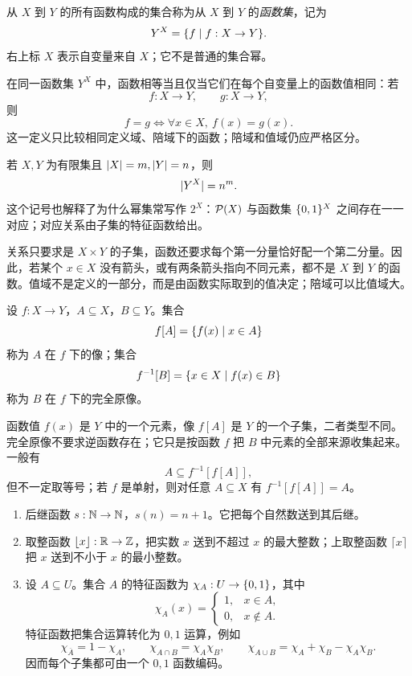 \begin{definition}[函数集]\label{function-set}
  从 $X$ 到 $Y$ 的所有函数构成的集合称为从 $X$ 到 $Y$ 的\emph{函数集}，记为
  \[
  Y^X=\{f\mid f:X\to Y\}.
  \]
  右上标 $X$ 表示自变量来自 $X$；它不是普通的集合幂。
\end{definition}

在同一函数集 $Y^X$ 中，函数相等当且仅当它们在每个自变量上的函数值相同：若
\[
f:X\to Y,\qquad g:X\to Y,
\]
则
\[
f=g\Longleftrightarrow \forall x\in X,\ f(x)=g(x).
\]
这一定义只比较相同定义域、陪域下的函数；陪域和值域仍应严格区分。

若 $X,Y$ 为有限集且 $\lvert X\rvert=m,\lvert Y\rvert=n$，则
\[
\lvert Y^X\rvert=n^m.
\]
这个记号也解释了为什么幂集常写作 $2^X$：$\mathcal P(X)$ 与函数集 $\{0,1\}^X$ 之间存在一一对应；对应关系由子集的特征函数给出。


\begin{pitfall}[函数与一般关系的区别]\label{function-relation}
  关系只要求是 $X\times Y$ 的子集，函数还要求每个第一分量恰好配一个第二分量。因此，若某个 $x\in X$ 没有箭头，或有两条箭头指向不同元素，都不是 $X$ 到 $Y$ 的函数。值域不是定义的一部分，而是由函数实际取到的值决定；陪域可以比值域大。
\end{pitfall}

\begin{definition}[像与完全原像]\label{image-preimage-function}
  设 $f:X\to Y$，$A\subseteq X$，$B\subseteq Y$。集合
  \[
  f[A]=\{f(x)\mid x\in A\}
  \]
  称为 $A$ 在 $f$ 下的像；集合
  \[
  f^{-1}[B]=\{x\in X\mid f(x)\in B\}
  \]
  称为 $B$ 在 $f$ 下的完全原像。
\end{definition}

函数值 $f(x)$ 是 $Y$ 中的一个元素，像 $f[A]$ 是 $Y$ 的一个子集，二者类型不同。完全原像不要求逆函数存在；它只是按函数 $f$ 把 $B$ 中元素的全部来源收集起来。一般有
\[
A\subseteq f^{-1}[f[A]],
\]
但不一定取等号；若 $f$ 是单射，则对任意 $A\subseteq X$ 有 $f^{-1}[f[A]]=A$。

\begin{example}[title={常见函数}]\label{basic-functions}
  \begin{enumerate}
    \item 后继函数 $s:\mathbb{N}\to\mathbb{N}$，$s(n)=n+1$。它把每个自然数送到其后继。
    \item 取整函数 $\lfloor x\rfloor:\mathbb{R}\to\mathbb{Z}$，把实数 $x$ 送到不超过 $x$ 的最大整数；上取整函数 $\lceil x\rceil$ 把 $x$ 送到不小于 $x$ 的最小整数。
    \item 设 $A\subseteq U$。集合 $A$ 的特征函数为 $\chi_A:U\to\{0,1\}$，其中
    \[
    \chi_A(x)=
    \begin{cases}
      1,&x\in A,\\
      0,&x\notin A.
    \end{cases}
    \]
    特征函数把集合运算转化为 $0,1$ 运算，例如
    \[
    \chi_{\overline A}=1-\chi_A,\qquad
    \chi_{A\cap B}=\chi_A\chi_B,\qquad
    \chi_{A\cup B}=\chi_A+\chi_B-\chi_A\chi_B.
    \]
    因而每个子集都可由一个 $0,1$ 函数编码。
  \end{enumerate}
\end{example}

